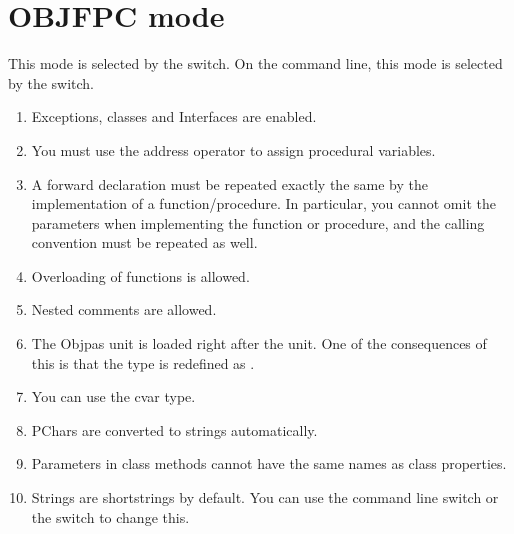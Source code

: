 
\section{OBJFPC mode}
This mode is selected by the  switch. On the command line,
this mode is selected by the  switch.
\begin{enumerate}
\item Exceptions, classes and Interfaces are enabled.
\item You must use the address operator to assign procedural variables.
\item A forward declaration must be repeated exactly the same by the
implementation of a function/procedure. In particular, you cannot omit the
parameters when implementing the function or procedure, and the calling
convention must be repeated as well.
\item Overloading of functions is allowed.
\item Nested comments are allowed.
\item The Objpas unit is loaded right after the  unit. One of the
consequences of this is that the type  is redefined as
.
\item You can use the cvar type.
\item PChars are converted to strings automatically.
\item Parameters in class methods cannot have the same names as class
properties.
\item Strings are shortstrings by default. You can use the 
command line switch or the  switch to change this.
\end{enumerate}

